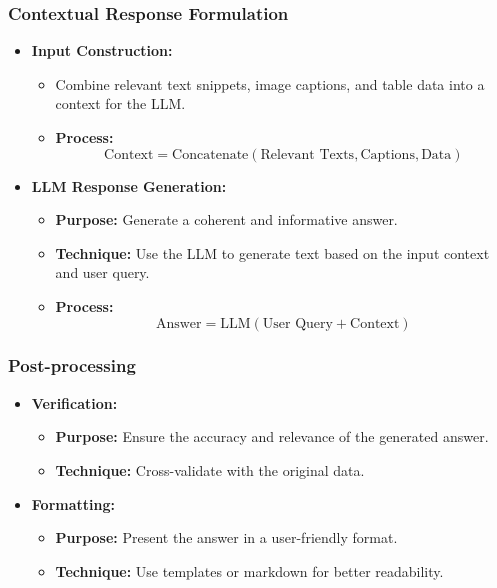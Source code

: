 \documentclass[12pt]{article}
\begin{document}
\subsubsection{Contextual Response Formulation}

\begin{itemize}
    \item \textbf{Input Construction:}
    \begin{itemize}
        \item Combine relevant text snippets, image captions, and table data into a context for the LLM.
        \item \textbf{Process:}
        \[
        \text{Context} = \text{Concatenate}(\text{Relevant Texts}, \text{Captions}, \text{Data})
        \]
    \end{itemize}
    \item \textbf{LLM Response Generation:}
    \begin{itemize}
        \item \textbf{Purpose:} Generate a coherent and informative answer.
        \item \textbf{Technique:} Use the LLM to generate text based on the input context and user query.
        \item \textbf{Process:}
        \[
        \text{Answer} = \text{LLM}(\text{User Query} + \text{Context})
        \]
    \end{itemize}
\end{itemize}

\subsubsection{Post-processing}

\begin{itemize}
    \item \textbf{Verification:}
    \begin{itemize}
        \item \textbf{Purpose:} Ensure the accuracy and relevance of the generated answer.
        \item \textbf{Technique:} Cross-validate with the original data.
    \end{itemize}
    \item \textbf{Formatting:}
    \begin{itemize}
        \item \textbf{Purpose:} Present the answer in a user-friendly format.
        \item \textbf{Technique:} Use templates or markdown for better readability.
    \end{itemize}
\end{itemize}
\end{document}
